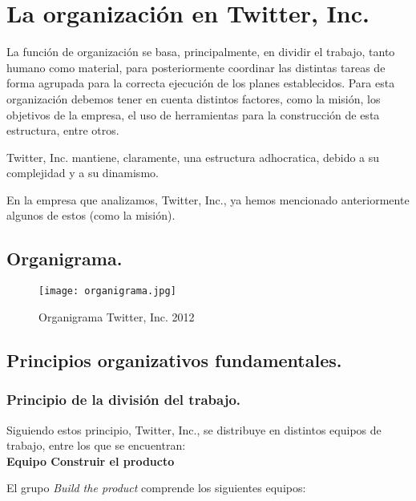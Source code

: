 \newpage

\section{La organización en Twitter, Inc.}

La función de organización se basa, principalmente, en dividir el trabajo, tanto humano como material, para posteriormente coordinar las distintas tareas de forma agrupada para la correcta ejecución de los planes establecidos. Para esta organización debemos tener en cuenta distintos factores, como la misión, los objetivos de la empresa, el uso de herramientas para la construcción de esta estructura, entre otros.

Twitter, Inc. mantiene, claramente, una estructura adhocratica, debido a su complejidad y a su dinamismo.

En la empresa que analizamos, Twitter, Inc., ya hemos mencionado anteriormente algunos de estos (como la misión).

\newpage

\subsection{Organigrama.}

\begin{figure}[!htb]
\centering
\texttt{[image: organigrama.jpg]}
\caption{\label{fig:frog}Organigrama Twitter, Inc. 2012}
\end{figure}


\subsection{Principios organizativos fundamentales.}

\subsubsection{Principio de la división del trabajo.}

Siguiendo estos principio, Twitter, Inc., se distribuye en distintos equipos de trabajo, entre los que se encuentran:\\

\textbf{Equipo Construir el producto}

El grupo \textit{Build the product} comprende los siguientes equipos:


